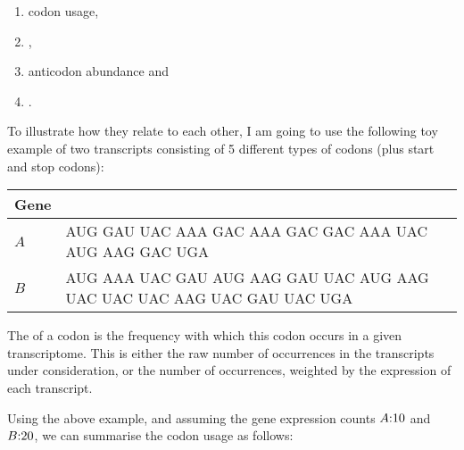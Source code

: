 \begin{enumerate}
    \item codon usage,
    \item \rcu,
    \item anticodon abundance and
    \item \raa.
\end{enumerate}

To illustrate how they relate to each other, I am going to use the following toy
example of two transcripts consisting of \num{5} different types of codons (plus
start and stop codons):

\begin{table}[H]
    \centering
    \begin{tabu} to 
        \toprule
        Gene &  \\
        \midrule
        \(A\) & AUG GAU UAC AAA GAC AAA GAC GAC AAA UAC AUG AAG GAC UGA \\
        \(B\) & AUG AAA UAC GAU AUG AAG GAU UAC AUG AAG UAC UAC UAC AAG UAC GAU UAC UGA \\
        \bottomrule
    \end{tabu}
\end{table}

The  of a codon is the frequency with which this codon
occurs in a given transcriptome. This is either the raw number of occurrences in
the transcripts under consideration, or the number of occurrences, weighted by
the expression of each transcript.

Using the above example, and assuming the gene expression counts \(A\text: 10\)
and \(B\text: 20\), we can summarise the codon usage as follows:

